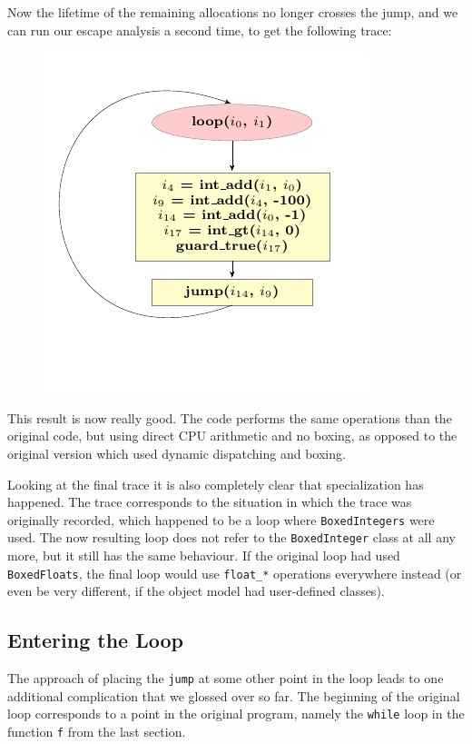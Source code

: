 \documentclass{sigplanconf}
\begin{document}
Now the lifetime of the remaining allocations no longer crosses the jump, and
we can run our escape analysis a second time, to get the following trace:
\begin{figure}
\includegraphics{figures/step3.pdf}
\end{figure}

This result is now really good. The code performs the same operations than
the original code, but using direct CPU arithmetic and no boxing, as opposed to
the original version which used dynamic dispatching and boxing.

Looking at the final trace it is also completely clear that specialization has
happened. The trace corresponds to the situation in which the trace was
originally recorded, which happened to be a loop where \texttt{BoxedIntegers} were
used. The now resulting loop does not refer to the \texttt{BoxedInteger} class at
all any more, but it still has the same behaviour. If the original loop had
used \texttt{BoxedFloats}, the final loop would use \texttt{float\_*} operations
everywhere instead (or even be very different, if the object model had
user-defined classes).



\subsection{Entering the Loop}

The approach of placing the \texttt{jump} at some other point in the loop leads to
one additional complication that we glossed over so far. The beginning of the
original loop corresponds to a point in the original program, namely the
\texttt{while} loop in the function \texttt{f} from the last section.
\end{document}
